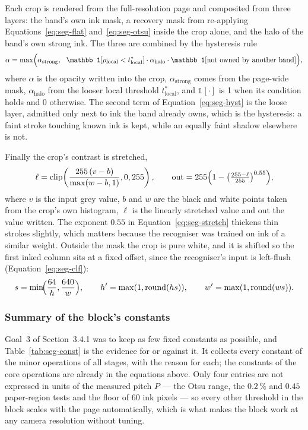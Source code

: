 Each crop is rendered from the full-resolution page and composited from three layers: the band's own ink mask, a recovery mask from re-applying Equations~\ref{eq:seg-flat} and~\ref{eq:seg-otsu} inside the crop alone, and the halo of the band's own strong ink. The three are combined by the hysteresis rule
\begin{equation}
\alpha=\max\Bigl(\alpha_{\mathrm{strong}},\ \ \mathbb 1[\rho_{\mathrm{local}}<t^*_{\mathrm{local}}]\cdot\alpha_{\mathrm{halo}}\cdot\mathbb 1[\text{not owned by another band}]\Bigr),
\label{eq:seg-hyst}
\end{equation}
where $\alpha$ is the opacity written into the crop, $\alpha_{\mathrm{strong}}$ comes from the page-wide mask, $\alpha_{\mathrm{halo}}$ from the looser local threshold $t^*_{\mathrm{local}}$, and $\mathbb 1[\cdot]$ is 1 when its condition holds and 0 otherwise. The second term of Equation~\ref{eq:seg-hyst} is the loose layer, admitted only next to ink the band already owns, which is the hysteresis: a faint stroke touching known ink is kept, while an equally faint shadow elsewhere is not.

Finally the crop's contrast is stretched,
\begin{equation}
\ell=\mathrm{clip}\!\left(\frac{255\,(v-b)}{\max(w-b,1)},0,255\right),\qquad
\mathrm{out}=255\Bigl(1-\bigl(\tfrac{255-\ell}{255}\bigr)^{0.55}\Bigr),
\label{eq:seg-stretch}
\end{equation}
where $v$ is the input grey value, $b$ and $w$ are the black and white points taken from the crop's own histogram, $\ell$ is the linearly stretched value and $\mathrm{out}$ the value written. The exponent $0.55$ in Equation~\ref{eq:seg-stretch} thickens thin strokes slightly, which matters because the recogniser was trained on ink of a similar weight. Outside the mask the crop is pure white, and it is shifted so the first inked column sits at a fixed offset, since the recogniser's input is left-flush (Equation~\ref{eq:seg-clf}):
\begin{equation}
s=\min\!\Bigl(\frac{64}{h},\frac{640}{w}\Bigr),\qquad h'=\max(1,\mathrm{round}(hs)),\qquad w'=\max(1,\mathrm{round}(ws)).\label{eq:seg-clf}
\end{equation}

\subsubsection{Summary of the block's constants}
\label{sec:seg-const}

Goal~3 of Section~3.4.1 was to keep as few fixed constants as possible, and Table~\ref{tab:seg-const} is the evidence for or against it. It collects every constant of the minor operations of all stages, with the reason for each; the constants of the core operations are already in the equations above. Only four entries are not expressed in units of the measured pitch $P$ --- the Otsu range, the $0.2\,\%$ and $0.45$ paper-region tests and the floor of 60 ink pixels --- so every other threshold in the block scales with the page automatically, which is what makes the block work at any camera resolution without tuning.


